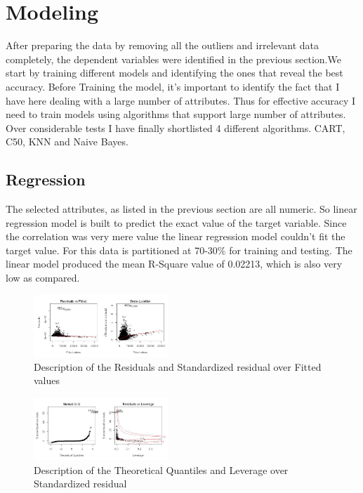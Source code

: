 \documentclass[sigchi]{acmart}
\begin{document}
\section{Modeling}
After preparing the data by removing all the outliers and irrelevant data completely, the dependent variables were identified in the previous section.We start by training different models and identifying the ones that reveal the best accuracy. Before Training the model, it’s important to identify the fact that I have here dealing with a large number of attributes. Thus for effective accuracy I need to train models using algorithms that support large number of attributes. Over considerable tests I have finally shortlisted 4 different algorithms. CART, C50, KNN and Naive Bayes.
\subsection{Regression}
The selected attributes, as listed in the previous section are all numeric. So linear regression model is built to predict the exact value of the target variable. Since the correlation was very mere value the linear regression model couldn’t fit the target value.
For this data is partitioned at 70-30\% for training and testing. The linear model produced the mean R-Square value of 0.02213, which is also very low as compared.
\begin{figure}[h!]
    \caption{Description of the Residuals and Standardized residual over Fitted values}
    \centering
    \includegraphics[width=0.45\textwidth]{Regression21.JPG}
\end{figure}
\begin{figure}[h!]
    \caption{Description of the Theoretical Quantiles and Leverage over Standardized residual}
    \centering
    \includegraphics[width=0.45\textwidth]{Regression22.JPG}
\end{figure}
\end{document}

